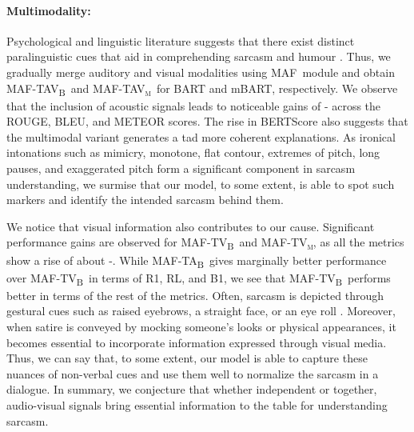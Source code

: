 \documentclass[11pt]{article}
\newcommand{\model}{\textsc{MAF}}
\newcommand{\modelTA}{\textsc{MAF-TA\textsubscript{B}}}
\newcommand{\modelTV}{\textsc{MAF-TV\textsubscript{B}}}
\newcommand{\modelTAV}{\textsc{MAF-TAV\textsubscript{B}}}
\newcommand{\modelTVm}{\textsc{MAF-TV\textsubscript{m}}}
\newcommand{\modelTAVm}{\textsc{MAF-TAV\textsubscript{m}}}
\begin{document}
\paragraph{Multimodality:} Psychological and linguistic literature suggests that there exist distinct paralinguistic cues that aid in comprehending sarcasm and humour \citep{attardo2003multimodal, Tabacaru_Lemmens_2014}. Thus, we gradually merge auditory and visual modalities using \model\ module and obtain \modelTAV\ and \modelTAVm\ for BART and mBART, respectively.
We observe that the inclusion of acoustic signals leads to noticeable gains of - across the ROUGE, BLEU, and METEOR scores. The rise in BERTScore also suggests that the multimodal variant generates a tad more coherent explanations. As ironical intonations such as mimicry, monotone, flat contour, extremes of pitch, long pauses, and exaggerated pitch \citep{rockwell2007vocal} form a significant component in sarcasm understanding, we surmise that our model, to some extent, is able to spot such markers and identify the intended sarcasm behind them. 

We notice that visual information also contributes to our cause. Significant performance gains are observed for \modelTV\ and \modelTVm, as all the metrics show a rise of about -. While \modelTA\ gives marginally better performance over \modelTV\ in terms of R1, RL, and B1, we see that \modelTV\ performs better in terms of the rest of the metrics. Often, sarcasm is depicted through gestural cues such as raised eyebrows, a straight face, or an eye roll \citep{attardo2003multimodal}. Moreover, when satire is conveyed by mocking someone's looks or physical appearances, it becomes essential to incorporate information expressed through visual media. Thus, we can say that, to some extent, our model is able to capture these nuances of non-verbal cues and use them well to normalize the sarcasm in a dialogue. In summary, we conjecture that whether independent or together, audio-visual signals bring essential information to the table for understanding sarcasm.
\end{document}
